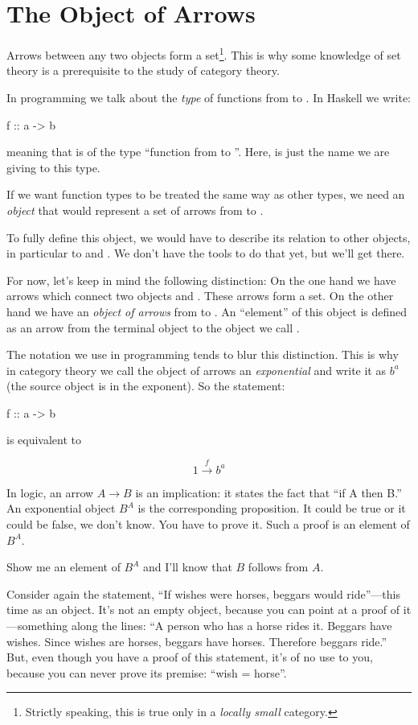 \documentclass[DaoFP]{subfiles}
\begin{document}
\section{The Object of Arrows}

Arrows between any two objects form a set\footnote{Strictly speaking, this is true only in a \emph{locally small} category.}. This is why some knowledge of set theory is a prerequisite to the study of category theory. 

In programming we talk about the \emph{type} of functions from  to . In Haskell we write:
\begin{haskell}
f :: a -> b
\end{haskell}
meaning that  is of the type ``function from  to ''. Here,  is just the name we are giving to this type. 

If we want function types to be treated the same way as other types, we need an \emph{object} that would represent a set of arrows from  to .

To fully define this object, we would have to describe its relation to other objects, in particular to  and . We don't have the tools to do that yet, but we'll get there. 

For now, let's keep in mind the following distinction: On the one hand we have arrows which connect two objects  and . These arrows form a set. On the other hand we have an \emph{object of arrows} from   to . An ``element'' of this object is defined as an arrow from the terminal object \hask{()} to the object we call . 

The notation we use in programming tends to blur this distinction. This is why in category theory we call the object of arrows an \emph{exponential} and write it as $ b^a$ (the source object is in the exponent). So the statement:
\begin{haskell}
f :: a -> b
\end{haskell}
is equivalent to

\[ 1 \xrightarrow f b^a\]

In logic, an arrow $ A \to B$ is an implication: it states the fact that ``if A then B.'' An exponential object $ B^A$ is the corresponding proposition. It could be true or it could be false, we don't know. You have to prove it. Such a proof is an element of $ B^A$. 

Show me an element of $ B^A$ and I'll know that $ B$ follows from $ A$.

Consider again the statement, ``If wishes were horses, beggars would ride''---this time as an object. It's not an empty object, because you can point at a proof of it---something along the lines: ``A person who has a horse rides it. Beggars have wishes. Since wishes are horses, beggars have horses. Therefore beggars ride.'' But, even though you have a proof of this statement, it's of no use to you, because you can never prove its premise: ``wish = horse''. 
\end{document}
